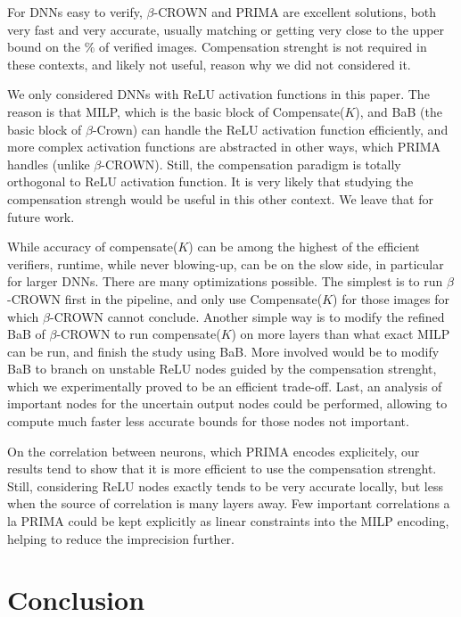 \documentclass{llncs}
\begin{document}
For DNNs easy to verify, $\beta$-CROWN and PRIMA are excellent solutions, both very fast and very accurate, usually matching or getting very close to the upper bound on the $\%$ of verified images. Compensation strenght is not required in these contexts, and likely not useful, reason why we did not considered it.

We only considered DNNs with ReLU activation functions in this paper. The reason is that MILP, which is the basic block of Compensate($K$), and BaB (the basic block of $\beta$-Crown) can handle the ReLU activation function efficiently, and more complex activation functions are abstracted in other ways, which PRIMA handles (unlike $\beta$-CROWN). Still, the compensation paradigm is totally orthogonal to ReLU activation function. It is very likely that studying the compensation strengh would be useful in this other context. We leave that for future work. 

While accuracy of compensate($K$) can be among the highest of the efficient verifiers, runtime, while never blowing-up, can be on the slow side, in particular for larger DNNs. There are many optimizations possible. The simplest is to run $\beta$-CROWN first in the pipeline, and only use Compensate($K$) for those images for which $\beta$-CROWN cannot conclude. Another simple way is to modify the refined BaB of 
$\beta$-CROWN to run compensate($K$) on more layers than what exact MILP can be run, and finish the study using BaB. More involved would be to modify BaB to branch on unstable ReLU nodes guided by the compensation strenght, which we experimentally proved to be an efficient trade-off. 
Last, an analysis of important nodes for the uncertain output nodes could be performed, allowing to compute much faster less accurate bounds for those nodes not important.

On the correlation between neurons, which PRIMA encodes explicitely, our results tend to show that it is more efficient to use the compensation strenght. Still, considering ReLU nodes exactly tends to be very accurate locally, but less when the source of correlation is many layers away. Few important correlations a la PRIMA could be kept explicitly as linear constraints into the MILP encoding, helping to reduce the imprecision further.






\section{Conclusion}
\end{document}
